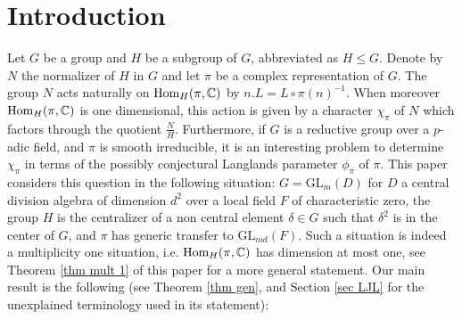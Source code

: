 \documentclass[11pt,letterpaper]{amsart}
\newcommand{\GL}{{\mathrm {GL}}} \newcommand{\PGL}{{\mathrm {PGL}}}
\newcommand{\Hom}{\mathrm{Hom}}
\def\d{\delta}
\def\e{\epsilon}
\theoremstyle{plain}
\numberwithin{equation}{section}
\begin{document}
	
\begin{abstract} 
Let $G$ be a group with subgroup $H$, and let $(\pi,V)$ be a complex representation of $G$. The natural action of the normalizer $N$ of $H$ in $G$ on the space $\Hom_H(\pi,\BC)$ of $H$-invariant linear forms on $V$, provides a representation $\chi_{\pi}$ of $N$ trivial on $H$, which is a character when $\Hom_H(\pi,\BC)$ is one dimensional. If moreover $G$ is a reductive group over a local field, and $\pi$ is smooth irreducible, it is an interesting problem to express $\chi_{\pi}$ in terms of the possibly conjectural Langlands parameter $\phi_\pi$ of $\pi$. In this paper we consider the following situation: $G=\GL_m(D)$ for $D$ a central division algebra of dimension $d^2$ over a local field $F$ of characteristic zero, $H$ is the centralizer of a non central element $\d\in G$ such that $\d^2$ is in the center of $G$, and $\pi$ has generic Jacquet-Langlands transfer to the split form $\GL_{md}(F)$ of $G$. In this setting the space $\Hom_H(\pi,\BC)$ is at most one dimensional. When $\Hom_H(\pi,\BC)\simeq \BC$ and $H\neq N$, we prove that the value of $\chi_{\pi}$ on the non trivial class of $\frac{N}{H}$ is $(-1)^m\e(\phi_\pi)$ where $\e(\phi_\pi)$ is the root number of $\phi_{\pi}$. Along the way we extend many useful multiplicity one results for linear and Shalika models to the case of non split $G$. When $F$ is $p$-adic we also classify standard modules with linear periods and Shalika models, which are new results even when $D$ is equal to $F$.
\end{abstract}

	
\section{Introduction}

Let $G$ be a group and $H$ be a subgroup of $G$, abbreviated as $H\leq G$. Denote by $N$ the normalizer of $H$ in $G$ and let $\pi$ be a complex representation of $G$.  The group $N$ acts naturally on $\Hom_H(\pi,\BC)$ by $n.L=L\circ \pi(n)^{-1}$. When moreover $\Hom_H(\pi,\BC)$ is one dimensional, this action is given 
by a character $\chi_\pi$ of $N$ which factors through the quotient $\frac{N}{H}$. Furthermore, if $G$ is a reductive group over a $p$-adic field, and $\pi$ is smooth irreducible, it is an interesting problem to determine $\chi_\pi$ in terms of the possibly conjectural Langlands parameter $\phi_{\pi}$ of $\pi$. This paper considers this question in the following situation: $G=\GL_m(D)$ for $D$ a central division algebra of dimension $d^2$ over a local field $F$ of characteristic zero, the group $H$ is the centralizer of a non central element $\d\in G$ such that $\d^2$ is in the center of $G$, and $\pi$ has generic transfer to $\GL_{md}(F)$. Such a situation is indeed a multiplicity one situation, i.e. $\Hom_H(\pi,\BC)$ has dimension at most one, see Theorem \ref{thm mult 1} of this paper for a more general statement. Our main result is the following (see Theorem \ref{thm gen}, and Section \ref{sec LJL} for the unexplained terminology used in its statement):
\end{document}
